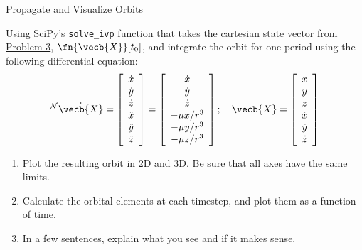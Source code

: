 \begin{hwkProblem}{4}{Propagate and Visualize Orbits} \label{hwk:p04}

	Using SciPy's \texttt{solve_ivp} function that takes the cartesian state vector from \hyperref[hwk:p03]{Problem 3}, \( \fn{\vecb{X}}[t_{0}] \), and integrate the orbit for one period using the following differential equation:
	\[
		{ }^{\mathcal{N}} \dot{\vecb{X}}=\left[\begin{array}{c}
				\dot{x}  \\
				\dot{y}  \\
				\dot{z}  \\
				\ddot{x} \\
				\ddot{y} \\
				\ddot{z}
			\end{array}\right]=\left[\begin{array}{c}
				\dot{x}      \\
				\dot{y}      \\
				\dot{z}      \\
				-\mu x / r^3 \\
				-\mu y / r^3 \\
				-\mu z / r^3
			\end{array}\right] ; \quad \vecb{X}=\left[\begin{array}{c}
				x       \\
				y       \\
				z       \\
				\dot{x} \\
				\dot{y} \\
				\dot{z}
			\end{array}\right]
	\]

	\begin{enumerate}
		\item \label{hwk:p04a} Plot the resulting orbit in 2D and 3D. Be sure that all axes have the same limits.
		\item \label{hwk:p04b} Calculate the orbital elements at each timestep, and plot them as a function of time.
		\item \label{hwk:p04c} In a few sentences, explain what you see and if it makes sense.
	\end{enumerate}

	\hwkSol{} \label{hwk:s04}

	\hwkPart{} \label{hwk:s04a}


\end{hwkProblem}
